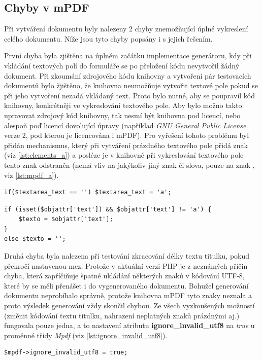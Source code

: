 \subsection{Chyby v mPDF}
Při vytváření dokumentu byly nalezeny 2 chyby znemožňující úplné vykreslení celého dokumentu. Níže jsou tyto chyby popsány i s jejich řešením.
\par
První chyba byla zjištěna na úplném začátku implementace generátoru, kdy při vkládání textových polí do formuláře se po přeložení kódu nevytvořil žádný dokument. Při zkoumání zdrojového kódu knihovny a vytvoření pár testovacích dokumentů bylo žjištěno, že knihovna neumožňuje vytvořit textové pole pokud se při jeho vytvoření nezadá vkládaný text. Proto bylo nutné, aby se poupravil kód knihovny, konkrétněji ve vykreslování textového pole. Aby bylo možno takto upravovat zdrojový kód knihovny, tak nesmí být knihovna pod licencí, nebo alespoň poď licencí dovolující úpravy (například \textit{GNU General Public License} verze 2, pod kterou je licencována i mPDF). Pro vyřešení tohoto problému byl přidán mechanismus, který při vytváření prázdného textového pole přidá znak  (viz \ref{lst:elements_a}) a posléze je v knihovně při vykreslování textového pole tento znak odstraněn (nemá vliv na jakýkoliv jiný znak či slova, pouze na znak , viz \ref{lst:mpdf_a}).
\newpage
\begin{lstlisting}[caption = {Přiřazení znaku \uv{\textbf{a}} jako text textového pole (HTMLElements.php)}, label = {lst:elements_a}, captionpos=b]
if($textarea_text == '') $textarea_text = 'a';
\end{lstlisting}
\begin{lstlisting}[caption = {Odstranění znaku \uv{\textbf{a}} z textového pole (Mpdf.php)}, label = {lst:mpdf_a}, captionpos=b]
if (isset($objattr['text']) && $objattr['text'] != 'a') {
	$texto = $objattr['text'];
}
else $texto = '';
\end{lstlisting}
\par
Druhá chyba byla nalezena při testování zkracování délky textu titulku, pokud překročí nastavenou mez. Protože v aktuální verzi PHP je z neznámých příčin chyba, která zapříčiňuje špatné ukládání některých znaků v kódování UTF-8, které by se měli přenášet i do vygenerovaného dokumentu. Bohužel generování dokumentu neprobíhalo správně, protože knihovna mPDF tyto znaky neznala a proto výsledek generování vždy skončil chybou. Ze všech vyzkoušených možností (změnit kódování textu titulku, nahrazení neplatných znaků prázdnými aj.) fungovala pouze jedna, a to nastavení atributu \textbf{ignore\_invalid\_utf8} na \textit{true} u proměnné třídy \textit{Mpdf} (viz \ref{lst:ignore_invalid_utf8}).
\begin{lstlisting}[caption = {Nastavení atributu \textbf{ignore\_invalid\_utf8} (orlib.php)}, label = {lst:ignore_invalid_utf8}, captionpos=b]
$mpdf->ignore_invalid_utf8 = true;
\end{lstlisting}

